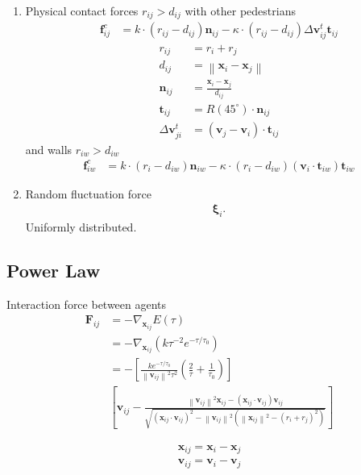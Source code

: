 \begin{enumerate}[label=\roman{enumi})]
\item 
Physical contact forces $ r_{ij} > d_{ij} $ with other pedestrians 
\begin{align}
\mathbf{f}_{ij}^{c} &= k \cdot (r_{ij} - d_{ij}) \mathbf{n}_{ij} - \kappa \cdot (r_{ij} - d_{ij}) \Delta \mathbf{v}_{ij}^{t} \mathbf{t}_{ij} 
\end{align}
\begin{align}
r_{ij} &= r_{i} + r_{j} \\
d_{ij} &= \left\|\mathbf{x}_{i} - \mathbf{x}_{j}\right\| \\
\mathbf{n}_{ij} &= \frac{\mathbf{x}_{i} - \mathbf{x}_{j}}{d_{ij}} \\
\mathbf{t}_{ij} &= R(45^{\circ}) \cdot \mathbf{n}_{ij} \\
\Delta \mathbf{v}_{ji}^{t} &= (\mathbf{v}_{j} - \mathbf{v}_{i}) \cdot \mathbf{t}_{ij}
\end{align}
and walls $ r_{iw} > d_{iw} $
\begin{align}
\mathbf{f}_{iw}^{c} &= k \cdot (r_{i} - d_{iw}) \mathbf{n}_{iw} - \kappa \cdot (r_{i} - d_{iw}) (\mathbf{v}_{i} \cdot \mathbf{t}_{iw}) \mathbf{t}_{iw}
\end{align}


\item 
Random fluctuation force
\begin{align}
\boldsymbol{\xi}_{i}.
\end{align}
Uniformly distributed.


\end{enumerate}


\subsection{Power Law}
Interaction force between agents
\begin{align}
\mathbf{F}_{ij} &= -\nabla_{\mathbf{x}_{ij}} E(\tau) \\
&= -\nabla_{\mathbf{x}_{ij}} \left(k \tau^{-2} e^{-\tau / \tau_{0}} \right)
\\
&= - \left[\frac{k e^{-\tau / \tau_{0}}}{\left\|\mathbf{v}_{ij}\right\|^{2} \tau^{2}} \left(\frac{2}{\tau} + \frac{1}{\tau_{0}}\right) \right] 
\\
&\left[ \mathbf{v}_{ij} - \frac{\left\|\mathbf{v}_{ij}\right\|^{2} \mathbf{x}_{ij} - \left(\mathbf{x}_{ij}\cdot\mathbf{v}_{ij}\right) \mathbf{v}_{ij} }{\sqrt{\left(\mathbf{x}_{ij}\cdot\mathbf{v}_{ij}\right)^{2} - \left\|\mathbf{v}_{ij}\right\|^{2} \left( \left\|\mathbf{x}_{ij}\right\|^{2} - \left(r_{i} + r_{j}\right)^{2} \right) }} \right]
\end{align}

\begin{align}
\mathbf{x}_{ij} = \mathbf{x}_{i} - \mathbf{x}_{j} \\
\mathbf{v}_{ij} = \mathbf{v}_{i} - \mathbf{v}_{j}
\end{align}



